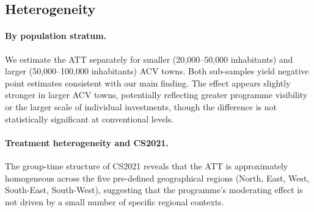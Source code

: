 \subsection{Heterogeneity}

\paragraph{By population stratum.} We estimate the ATT separately for smaller (20{,}000--50{,}000 inhabitants) and larger (50{,}000--100{,}000 inhabitants) ACV towns. Both sub-samples yield negative point estimates consistent with our main finding. The effect appears slightly stronger in larger ACV towns, potentially reflecting greater programme visibility or the larger scale of individual investments, though the difference is not statistically significant at conventional levels.

\paragraph{Treatment heterogeneity and CS2021.} The group-time structure of CS2021 reveals that the ATT is approximately homogeneous across the five pre-defined geographical regions (North, East, West, South-East, South-West), suggesting that the programme's moderating effect is not driven by a small number of specific regional contexts.
